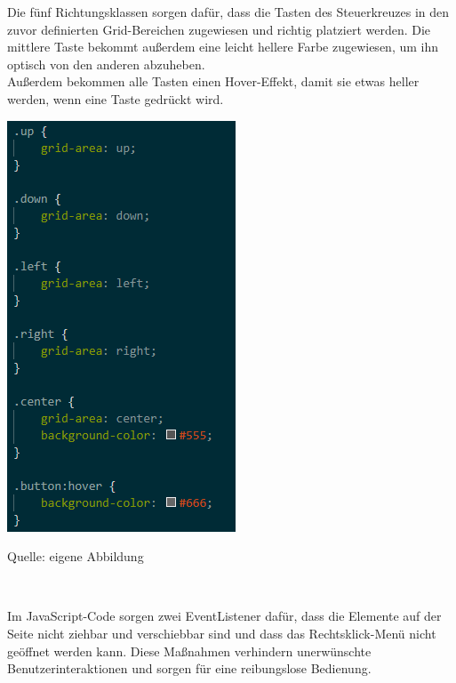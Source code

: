 \documentclass[ngerman,12pt,a4paper]{article}
\begin{document}
	Die fünf Richtungsklassen sorgen dafür, dass die Tasten des Steuerkreuzes in den zuvor definierten Grid-Bereichen zugewiesen und richtig platziert werden. Die mittlere Taste bekommt außerdem eine leicht hellere Farbe zugewiesen, um ihn optisch von den anderen abzuheben. \\[0.5cm]
	Außerdem bekommen alle Tasten einen Hover-Effekt, damit sie etwas heller werden, wenn eine Taste gedrückt wird. \\
	\begin{center}
		\begin{minipage}[t]{0.45\textwidth}
			\includegraphics{Pictures/Steuerung-css2}
			\label{fig:Steuerkreuz-css2}
			\vspace{-10pt}
			\begin{center}
				\par\small Quelle: eigene Abbildung 
			\end{center}
		\end{minipage} \\[0.75cm]
	\end{center}
	Im JavaScript-Code sorgen zwei EventListener dafür, dass die Elemente auf der Seite nicht ziehbar und verschiebbar sind und dass das Rechtsklick-Menü nicht geöffnet werden kann. Diese Maßnahmen verhindern unerwünschte Benutzerinteraktionen und sorgen für eine reibungslose Bedienung. \\[0.5cm]
\end{document}
